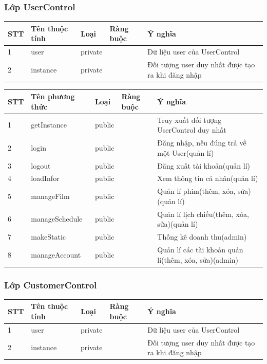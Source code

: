 \documentclass[a4paper, 12pt]{article}
\begin{document}
\subsubsection{Lớp UserControl}
\begin{table}[H]
\centering
\begin{tabular}{|l|l|l|l|l|}
\hline
STT & Tên thuộc tính & Loại    & Ràng buộc & Ý nghĩa                                           \\ \hline
1   & user           & private &           & Dữ liệu user của UserControl                      \\ \hline
2   & instance       & private &           & Đối tượng user duy nhất được tạo ra khi đăng nhập \\ \hline
\end{tabular}
\end{table}
\begin{table}[H]
\centering
\begin{tabular}{|l|l|l|l|l|}
\hline
STT & Tên phương thức & Loại   & Ràng buộc & Ý nghĩa                                              \\ \hline
1   & getInstance     & public &           & Truy xuất đối tượng UserControl duy nhất             \\ \hline
2   & login           & public &           & Đăng nhập, nếu đúng trả về một User(quản lí)         \\ \hline
3   & logout          & public &           & Đăng xuất tài khoản(quản lí)                         \\ \hline
4   & loadInfor       & public &           & Xem thông tin cá nhân(quản lí)                       \\ \hline
5   & manageFilm      & public &           & Quản lí phim(thêm, xóa, sửa)(quản lí)                \\ \hline
6   & manageSchedule  & public &           & Quản lí lịch chiếu(thêm, xóa, sửa)(quản lí)          \\ \hline
7   & makeStatic      & public &           & Thống kê doanh thu(admin)                            \\ \hline
8   & manageAccount   & public &           & Quản lí các tài khoản quản lí(thêm, xóa, sửa)(admin) \\ \hline
\end{tabular}
\end{table}
\subsubsection{Lớp CustomerControl}
\begin{table}[H]
\centering
\begin{tabular}{|l|l|l|l|l|}
\hline
STT & Tên thuộc tính & Loại    & Ràng buộc & Ý nghĩa                                           \\ \hline
1   & user           & private &           & Dữ liệu user của UserControl                      \\ \hline
2   & instance       & private &           & Đối tượng user duy nhất được tạo ra khi đăng nhập \\ \hline
\end{tabular}
\end{table}
\end{document}
